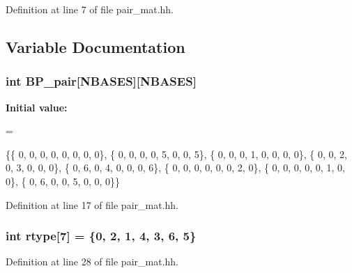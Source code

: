 Definition at line 7 of file pair\+\_\+mat.\+hh.



\subsection{Variable Documentation}
\hypertarget{pair__mat_8hh_a4d0b503b0d6831ff671757e5b196ed14}{
\subsubsection[{B\+P\+\_\+pair}]{\setlength{\rightskip}{0pt plus 5cm}int B\+P\+\_\+pair\mbox{[}{\bf N\+B\+A\+S\+E\+S}\mbox{]}\mbox{[}{\bf N\+B\+A\+S\+E\+S}\mbox{]}\hspace{0.3cm}{\ttfamily [static]}}}\label{pair__mat_8hh_a4d0b503b0d6831ff671757e5b196ed14}
{\bfseries Initial value\+:}
\begin{DoxyCode}
=

\{\{ 0, 0, 0, 0, 0, 0, 0, 0\},
 \{ 0, 0, 0, 0, 5, 0, 0, 5\},
 \{ 0, 0, 0, 1, 0, 0, 0, 0\},
 \{ 0, 0, 2, 0, 3, 0, 0, 0\},
 \{ 0, 6, 0, 4, 0, 0, 0, 6\},
 \{ 0, 0, 0, 0, 0, 0, 2, 0\},
 \{ 0, 0, 0, 0, 0, 1, 0, 0\},
 \{ 0, 6, 0, 0, 5, 0, 0, 0\}\}
\end{DoxyCode}


Definition at line 17 of file pair\+\_\+mat.\+hh.

\hypertarget{pair__mat_8hh_a0c7d147d8a3269289b4d69479e7f8fa6}{
\subsubsection[{rtype}]{\setlength{\rightskip}{0pt plus 5cm}int rtype\mbox{[}7\mbox{]} = \{0, 2, 1, 4, 3, 6, 5\}\hspace{0.3cm}{\ttfamily [static]}}}\label{pair__mat_8hh_a0c7d147d8a3269289b4d69479e7f8fa6}


Definition at line 28 of file pair\+\_\+mat.\+hh.

